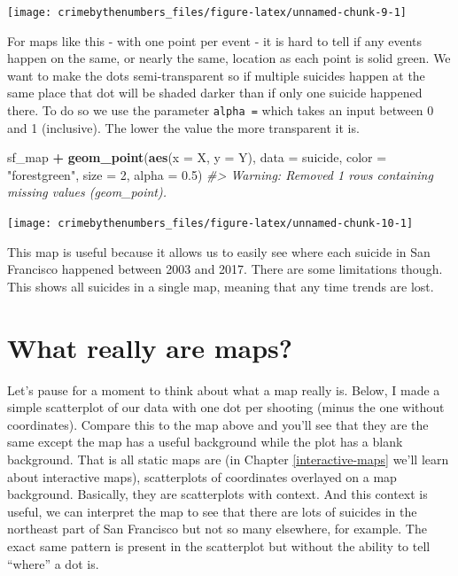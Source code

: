 \documentclass[
  12pt,
]{book}
\newenvironment{Shaded}{\begin{snugshade}}{\end{snugshade}}
\newcommand{\CommentTok}[1]{\textcolor[rgb]{0.37,0.37,0.37}{\textit{#1}}}
\newcommand{\DataTypeTok}[1]{\textcolor[rgb]{0.27,0.27,0.27}{#1}}
\newcommand{\DecValTok}[1]{\textcolor[rgb]{0.06,0.06,0.06}{#1}}
\newcommand{\FloatTok}[1]{\textcolor[rgb]{0.06,0.06,0.06}{#1}}
\newcommand{\KeywordTok}[1]{\textcolor[rgb]{0.27,0.27,0.27}{\textbf{#1}}}
\newcommand{\NormalTok}[1]{#1}
\newcommand{\OperatorTok}[1]{\textcolor[rgb]{0.43,0.43,0.43}{\textbf{#1}}}
\newcommand{\StringTok}[1]{\textcolor[rgb]{0.5,0.5,0.5}{#1}}
\begin{document}
\begin{center}\texttt{[image: crimebythenumbers\_files/figure-latex/unnamed-chunk-9-1]} \end{center}

For maps like this - with one point per event - it is hard to tell if any events happen on the same, or nearly the same, location as each point is solid green. We want to make the dots semi-transparent so if multiple suicides happen at the same place that dot will be shaded darker than if only one suicide happened there. To do so we use the parameter \texttt{alpha\ =} which takes an input between 0 and 1 (inclusive). The lower the value the more transparent it is.

\begin{Shaded}
\begin{Highlighting}[]
\NormalTok{sf\_map }\OperatorTok{+}
\StringTok{  }\KeywordTok{geom\_point}\NormalTok{(}\KeywordTok{aes}\NormalTok{(}\DataTypeTok{x =}\NormalTok{ X, }\DataTypeTok{y =}\NormalTok{ Y),}
             \DataTypeTok{data  =}\NormalTok{ suicide,}
             \DataTypeTok{color =} \StringTok{"forestgreen"}\NormalTok{,}
             \DataTypeTok{size  =} \DecValTok{2}\NormalTok{,}
             \DataTypeTok{alpha =} \FloatTok{0.5}\NormalTok{)}
\CommentTok{\#> Warning: Removed 1 rows containing missing values (geom\_point).}
\end{Highlighting}
\end{Shaded}

\begin{center}\texttt{[image: crimebythenumbers\_files/figure-latex/unnamed-chunk-10-1]} \end{center}

This map is useful because it allows us to easily see where each suicide in San Francisco happened between 2003 and 2017. There are some limitations though. This shows all suicides in a single map, meaning that any time trends are lost.

\hypertarget{what-really-are-maps}{%
\section{What really are maps?}\label{what-really-are-maps}}

Let's pause for a moment to think about what a map really is. Below, I made a simple scatterplot of our data with one dot per shooting (minus the one without coordinates). Compare this to the map above and you'll see that they are the same except the map has a useful background while the plot has a blank background. That is all static maps are (in Chapter \ref{interactive-maps} we'll learn about interactive maps), scatterplots of coordinates overlayed on a map background. Basically, they are scatterplots with context. And this context is useful, we can interpret the map to see that there are lots of suicides in the northeast part of San Francisco but not so many elsewhere, for example. The exact same pattern is present in the scatterplot but without the ability to tell ``where'' a dot is.
\end{document}
